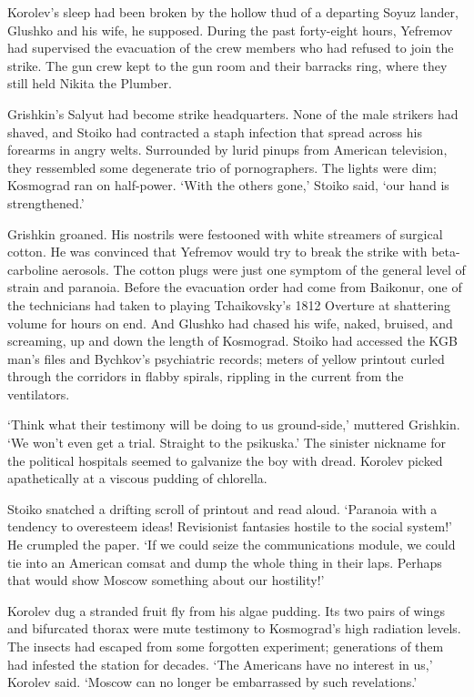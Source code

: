 Korolev’s sleep had been broken by the hollow thud of a departing Soyuz lander, Glushko and his wife, he supposed. During the past forty-eight hours, Yefremov had supervised the evacuation of the crew members who had refused to join the strike. The gun crew kept to the gun room and their barracks ring, where they still held Nikita the Plumber.

Grishkin’s Salyut had become strike headquarters. None of the male strikers had shaved, and Stoiko had contracted a staph infection that spread across his forearms in angry welts. Surrounded by lurid pinups from American television, they ressembled some degenerate trio of pornographers. The lights were dim; Kosmograd ran on half-power. ‘With the others gone,’ Stoiko said, ‘our hand is strengthened.’

Grishkin groaned. His nostrils were festooned with white streamers of surgical cotton. He was convinced that Yefremov would try to break the strike with beta-carboline aerosols. The cotton plugs were just one symptom of the general level of strain and paranoia. Before the evacuation order had come from Baikonur, one of the technicians had taken to playing Tchaikovsky’s 1812 Overture at shattering volume for hours on end. And Glushko had chased his wife, naked, bruised, and screaming, up and down the length of Kosmograd. Stoiko had accessed the KGB man’s files and Bychkov’s psychiatric records; meters of yellow printout curled through the corridors in flabby spirals, rippling in the current from the ventilators.

‘Think what their testimony will be doing to us ground-side,’ muttered Grishkin. ‘We won’t even get a trial. Straight to the psikuska.’ The sinister nickname for the political hospitals seemed to galvanize the boy with dread. Korolev picked apathetically at a viscous pudding of chlorella.

Stoiko snatched a drifting scroll of printout and read aloud. ‘Paranoia with a tendency to overesteem ideas! Revisionist fantasies hostile to the social system!’ He crumpled the paper. ‘If we could seize the communications module, we could tie into an American comsat and dump the whole thing in their laps. Perhaps that would show Moscow something about our hostility!’

Korolev dug a stranded fruit fly from his algae pudding. Its two pairs of wings and bifurcated thorax were mute testimony to Kosmograd’s high radiation levels. The insects had escaped from some forgotten experiment; generations of them had infested the station for decades. ‘The Americans have no interest in us,’ Korolev said. ‘Moscow can no longer be embarrassed by such revelations.’

